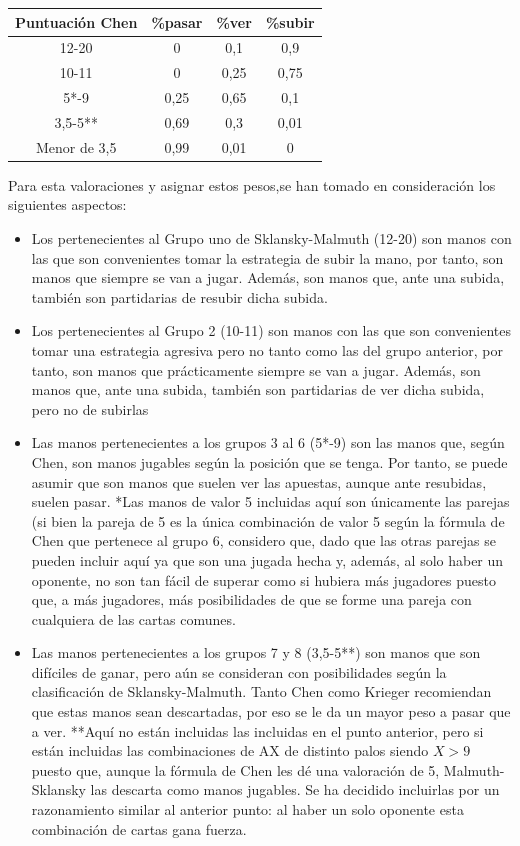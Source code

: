 \begin{longtable}[c]{|c|c|c|c|}
\hline
\rowcolor{lightgray}Puntuación Chen & \%pasar & \%ver & \%subir \\ \hline
12-20 & 0 & 0,1 & 0,9 \\ \hline
10-11 & 0 & 0,25 & 0,75 \\ \hline
5*-9 & 0,25 & 0,65 & 0,1 \\ \hline
3,5-5** & 0,69 & 0,3 & 0,01 \\ \hline
Menor de 3,5 & 0,99 & 0,01 & 0 \\ \hline
\end{longtable}

Para esta valoraciones y asignar estos pesos,se han tomado en consideración los siguientes aspectos:
\begin{itemize}
\item Los pertenecientes al Grupo uno de Sklansky-Malmuth (12-20) son manos con las que son convenientes tomar la estrategia de subir la mano, por tanto, son manos que siempre se van a jugar. Además, son manos que, ante una subida, también son partidarias de resubir dicha subida.
\item Los pertenecientes al Grupo 2 (10-11) son manos con las que son convenientes tomar una estrategia agresiva pero no tanto como las del grupo anterior, por tanto, son manos que prácticamente siempre se van a jugar. Además, son manos que, ante una subida, también son partidarias de ver dicha subida, pero no de subirlas
\item Las manos pertenecientes a los grupos 3 al 6 (5*-9) son las manos que, según Chen, son manos jugables según la posición que se tenga. Por tanto, se puede asumir que son manos que suelen ver las apuestas, aunque ante resubidas, suelen pasar.  *Las manos de valor 5 incluidas aquí son únicamente las parejas (si bien la pareja de 5 es la única combinación de valor 5 según la fórmula de Chen que pertenece al grupo 6, considero que, dado que las otras parejas se pueden incluir aquí ya que son una jugada hecha y, además, al solo haber un oponente, no son tan fácil de superar como si hubiera más jugadores puesto que, a más jugadores, más posibilidades de que se forme una pareja con cualquiera de las cartas comunes.
\item Las manos pertenecientes a los grupos 7 y 8 (3,5-5**) son manos que son difíciles de ganar, pero aún se consideran con posibilidades según la clasificación de Sklansky-Malmuth. Tanto Chen como Krieger\cite{krieger} recomiendan que estas manos sean descartadas, por eso se le da un mayor peso a pasar que a ver. **Aquí no están incluidas las incluidas en el punto anterior, pero si están incluidas las combinaciones de AX de distinto palos siendo $X>9$ puesto que, aunque la fórmula de Chen les dé una valoración de 5, Malmuth-Sklansky las descarta como manos jugables. Se ha decidido incluirlas por un razonamiento similar al anterior punto: al haber un solo oponente esta combinación de cartas gana fuerza.

\end{itemize}

